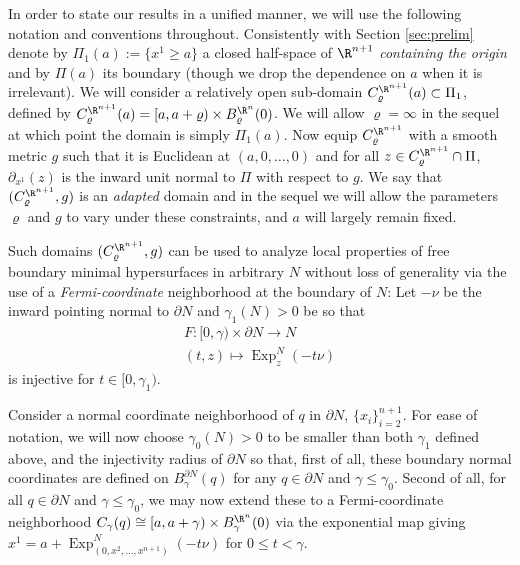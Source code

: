         	 	In order to state our results in a unified manner, we will use the following notation and conventions throughout. Consistently with Section \ref{sec:prelim} denote by $\Pi_1(a):=\{x^1\geqslant a\}$ a closed half-space of $\R^{n+1}$ \emph{containing the origin} and by $\Pi(a)$ its boundary (though we drop the dependence on $a$ when it is irrelevant).  We will consider %
        	 	a relatively open sub-domain $C^{\R^{n+1}}_\varrho(a)\subset \Pi_1$,  %
        	 	defined by $C^{\R^{n+1}}_\varrho(a)=[a,a+\varrho)\times B^{\R^n}_\varrho (0)$. We will allow $\varrho=\infty$ in the sequel at which point the domain is simply $\Pi_1(a)$.  %
        	 	Now equip $C^{\R^{n+1}}_\varrho$ with a smooth metric $g$ such that it is Euclidean at $(a,0,\dots,0)$ and for all $z\in C^{\R^{n+1}}_\varrho\cap \Pi$, $\partial_{x^1}(z)$ is the inward unit normal to $\Pi$ with respect to $g$. We say that $(C^{\R^{n+1}}_\varrho,g)$ is an \emph{adapted} domain and in the sequel we will allow the parameters $\varrho$ and $g$ to vary under these constraints, and $a$ will largely remain fixed.   %
        	 	
        	 	
        	 	Such domains $(C^{\R^{n+1}}_\varrho,g)$ can be used to analyze local properties of free boundary minimal hypersurfaces in arbitrary $N$ without loss of generality via the use of
        	 	a \emph{Fermi-coordinate} neighborhood at the boundary of $N$: 
        	 	Let $-\nu$ be the inward pointing normal to $\partial N$ and $\gamma_1(N)>0$ be so that 
        	 	\begin{eqnarray*}
        	 		& F:[0,\gamma)\times \partial N \longrightarrow N&\\
        	 		&(t,z)\longmapsto \operatorname{Exp}^N_z (-t\nu)&
        	 	\end{eqnarray*} 
        	 	is injective for $t\in [0,\gamma_1)$. 
        	 	
        	 	Consider a normal coordinate neighborhood of $q$ in $\partial N$, $\{x_i\}_{i=2}^{n+1}$. For ease of notation, we will now choose $\gamma_0(N) >0$ to be smaller than both $\gamma_1$ defined above, and the injectivity radius of $\partial N$ so that, first of all, these boundary normal coordinates are defined on $B^{\partial N}_\gamma (q)$ for any $q\in \partial N$ and $\gamma \leqslant \gamma_0$. Second of all, for all $q\in \partial N$ and $\gamma\leqslant \gamma_0$, we may now extend these to a Fermi-coordinate neighborhood $C_{\gamma}(q) \cong [a,a+\gamma)\times B^{\R^n}_\gamma (0)$ via the exponential map giving $x^{1} = a+ \operatorname{Exp}^N_{(0,x^2,\dots,x^{n+1})} (-t\nu)$ for $0\leqslant t<\gamma$. 
        	 	
